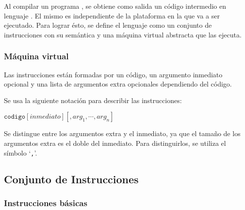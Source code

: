   Al compilar un programa \frob{}, se obtiene como salida un código
intermedio en lenguaje \alf{}.
  El mismo es independiente de la plataforma en la que va a ser ejecutado.
  Para lograr ésto, se define el lenguaje como un conjunto de instrucciones
con su semántica y una máquina virtual abstracta que las ejecuta.



\subsubsection{Máquina virtual}
\label{section:diseno}



  Las instrucciones están formadas por un código, un argumento inmediato
  opcional y una lista de argumentos extra opcionales dependiendo del
  código.

  Se usa la siguiente notación para describir las instrucciones:
  \begin{center}
    $\texttt{codigo} [\textit{inmediato}] [, {arg}_1, \dotsb, {arg}_n ]$
  \end{center}

   Se distingue entre los argumentos extra y el inmediato, ya que el
   tamaño de los argumentos extra es el doble del inmediato.
   Para distinguirlos, se utiliza el símbolo `\texttt{,}'.

\subsection{Conjunto de Instrucciones}

\subsubsection{Instrucciones básicas}


